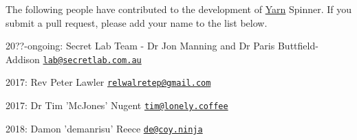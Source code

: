 The following people have contributed to the development of \hyperlink{a00041}{Yarn} Spinner. If you submit a pull request, please add your name to the list below.


\begin{DoxyItemize}
\item 20??-\/ongoing\-: Secret Lab Team -\/ Dr Jon Manning and Dr Paris Buttfield-\/\-Addison \href{mailto:lab@secretlab.com.au}{\tt lab@secretlab.\-com.\-au}
\item 2017\-: Rev Peter Lawler \href{mailto:relwalretep@gmail.com}{\tt relwalretep@gmail.\-com}
\item 2017\-: Dr Tim 'Mc\-Jones' Nugent \href{mailto:tim@lonely.coffee}{\tt tim@lonely.\-coffee}
\item 2018\-: Damon 'demanrisu' Reece \href{mailto:de@coy.ninja}{\tt de@coy.\-ninja} 
\end{DoxyItemize}